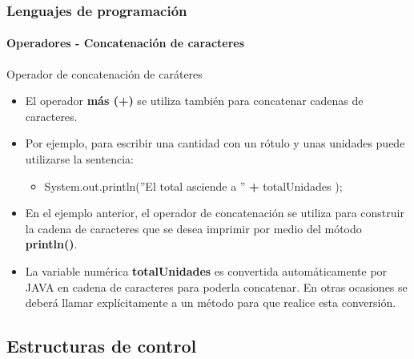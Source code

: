 \documentclass{beamer}
\begin{document}
		\begin{frame}
			\frametitle{Lenguajes de programaci\'on} 
			\framesubtitle{Operadores - Concatenaci\'on de caracteres}

			\begin{block}{Operador de concatenaci\'on de car\'ateres}
				\begin{itemize}
					\item El operador \textbf{m\'as (+)} se utiliza tambi\'en para concatenar cadenas de caracteres.
					\item Por ejemplo, para escribir una cantidad con un r\'otulo y unas unidades puede utilizarse la sentencia:
					\begin{itemize}
						\item System.out.println(''El total asciende a '' \textbf{+} totalUnidades );
					\end{itemize}
					\item En el ejemplo anterior, el operador de concatenaci\'on se utiliza para construir la cadena de caracteres que se desea imprimir por medio del m\'otodo \textbf{println()}.
					\item La variable num\'erica \textbf{totalUnidades} es convertida autom\'aticamente por JAVA en cadena de caracteres para poderla concatenar. En otras ocasiones se deber\'a llamar expl\'icitamente a un m\'etodo para que realice esta conversi\'on.
				\end{itemize}
			\end{block}
		\end{frame}

		\subsection{Estructuras de control}
\end{document}

